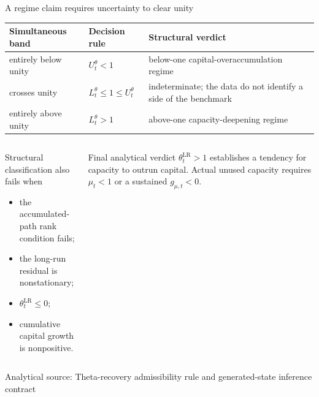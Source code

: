 \documentclass[10pt,aspectratio=169]{beamer}
\newcommand{\LR}{\mathrm{LR}}
\newcommand{\sourcefooter}[1]{%
  \par\vfill{\tiny\color{gray!70}Analytical source: #1}\vspace{-0.35em}}
\begin{document}
\begin{frame}{A regime claim requires uncertainty to clear unity}
  \small
  \renewcommand{\arraystretch}{1.5}
  \begin{tabular}{@{}L{0.25\textwidth}L{0.29\textwidth}L{0.38\textwidth}@{}}
    \toprule
    \textbf{Simultaneous band} & \textbf{Decision rule} & \textbf{Structural verdict} \\
    \midrule
    entirely below unity & $U_t^{\theta}<1$ & below-one capital-overaccumulation regime \\
    crosses unity & $L_t^{\theta}\leq1\leq U_t^{\theta}$ & indeterminate; the data do not identify a side of the benchmark \\
    entirely above unity & $L_t^{\theta}>1$ & above-one capacity-deepening regime \\
    \bottomrule
  \end{tabular}

  \vspace{0.8em}
  \begin{columns}[T,onlytextwidth]
    \begin{column}{0.48\textwidth}
      \begin{block}{Structural classification also fails when}
        \begin{itemize}\small
          \item the accumulated-path rank condition fails;
          \item the long-run residual is nonstationary;
          \item $\theta_t^{\LR}\leq0$;
          \item cumulative capital growth is nonpositive.
        \end{itemize}
      \end{block}
    \end{column}
    \begin{column}{0.48\textwidth}
      \begin{alertblock}{Final analytical verdict}
        $\theta_t^{\LR}>1$ establishes a tendency for capacity to outrun capital. Actual unused capacity requires $\mu_t<1$ or a sustained $g_{\mu,t}<0$.
      \end{alertblock}
    \end{column}
  \end{columns}
  \sourcefooter{Theta-recovery admissibility rule and generated-state inference contract}
\end{frame}

\appendix
\end{document}
